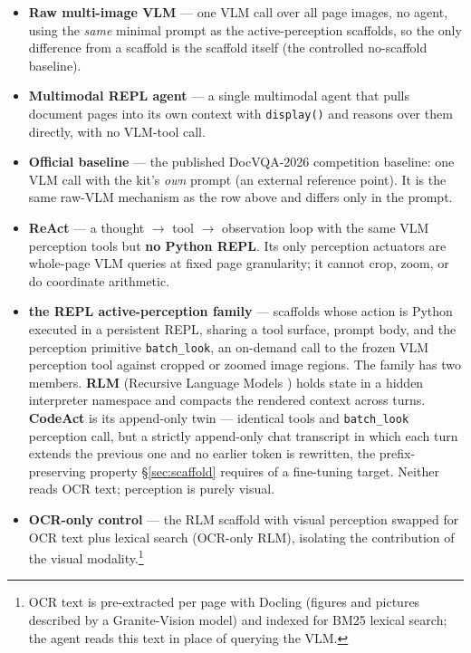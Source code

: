 \begin{itemize}
\item \textbf{Raw multi-image VLM} --- one VLM call over all page images, no agent, using the \emph{same} minimal prompt as the active-perception scaffolds, so the only difference from a scaffold is the scaffold itself (the controlled no-scaffold baseline).
\item \textbf{Multimodal REPL agent} --- a single multimodal agent that pulls document pages into its own context with \texttt{display()} and reasons over them directly, with no VLM-tool call.
\item \textbf{Official baseline} --- the published DocVQA-2026 competition baseline: one VLM call with the kit's \emph{own} prompt (an external reference point). It is the same raw-VLM mechanism as the row above and differs only in the prompt.
\item \textbf{ReAct} --- a thought $\rightarrow$ tool $\rightarrow$ observation loop with the same VLM perception tools but \textbf{no Python REPL}. Its only perception actuators are whole-page VLM queries at fixed page granularity; it cannot crop, zoom, or do coordinate arithmetic.
\item \textbf{the REPL active-perception family} --- scaffolds whose action is Python executed in a persistent REPL, sharing a tool surface, prompt body, and the perception primitive \texttt{batch\_look}, an on-demand call to the frozen VLM perception tool against cropped or zoomed image regions. The family has two members. \textbf{RLM} (Recursive Language Models \citep{rlm}) holds state in a hidden interpreter namespace and compacts the rendered context across turns. \textbf{CodeAct} \citep{codeact} is its append-only twin --- identical tools and \texttt{batch\_look} perception call, but a strictly append-only chat transcript in which each turn extends the previous one and no earlier token is rewritten, the prefix-preserving property \S\ref{sec:scaffold} requires of a fine-tuning target. Neither reads OCR text; perception is purely visual.
\item \textbf{OCR-only control} --- the RLM scaffold with visual perception swapped for OCR text plus lexical search (OCR-only RLM), isolating the contribution of the visual modality.\footnote{OCR text is pre-extracted per page with Docling (figures and pictures described by a Granite-Vision model) and indexed for BM25 lexical search; the agent reads this text in place of querying the VLM.}
\end{itemize}

